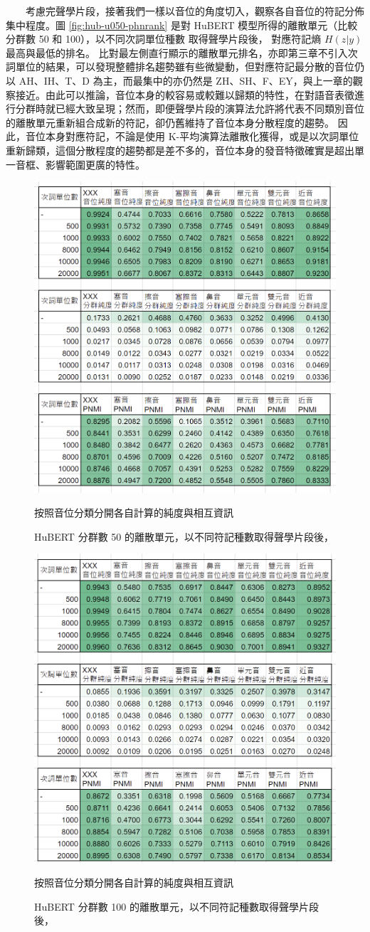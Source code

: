     
　　考慮完聲學片段，接著我們一樣以音位的角度切入，觀察各自音位的符記分佈集中程度。圖 \ref{fig:hub-u050-phnrank} 是對 HuBERT 模型所得的離散單元（比較分群數 50 和 100），以不同次詞單位種數
取得聲學片段後，
對應符記熵 $H(z|y)$ 最高與最低的排名。
比對最左側直行顯示的離散單元排名，亦即第三章不引入次詞單位的結果，可以發現整體排名趨勢雖有些微變動，但對應符記最分散的音位仍以 AH、IH、T、D 為主，而最集中的亦仍然是 ZH、SH、F、EY，與上一章的觀察接近。由此可以推論，音位本身的較容易或較難以歸類的特性，在對語音表徵進行分群時就已經大致呈現；然而，即便聲學片段的演算法允許將代表不同類別音位的離散單元重新組合成新的符記，卻仍舊維持了音位本身分散程度的趨勢。
因此，音位本身對應符記，不論是使用 K-平均演算法離散化獲得，或是以次詞單位重新歸類，這個分散程度的趨勢都是差不多的，音位本身的發音特徵確實是超出單一音框、影響範圍更廣的特性。 




{
\begin{figure}  %
    \centering
    \includegraphics[width=0.6\linewidth]{figures/ch4figs/hub50-ap-detailedpur.png}
    \caption{HuBERT 分群數 50 的離散單元，以不同符記種數取得聲學片段後，}
    按照音位分類分開各自計算的純度與相互資訊
    \label{fig:hub50-ap-detailedpur}
\end{figure}
}


\begin{figure}
    \centering
    \includegraphics[width=0.6\linewidth]{figures/ch4figs/hub100-ap-detailedpur.png}
     \caption{HuBERT 分群數 100 的離散單元，以不同符記種數取得聲學片段後，}
    按照音位分類分開各自計算的純度與相互資訊
    \label{fig:hub100-ap-detailedpur}
\end{figure}


